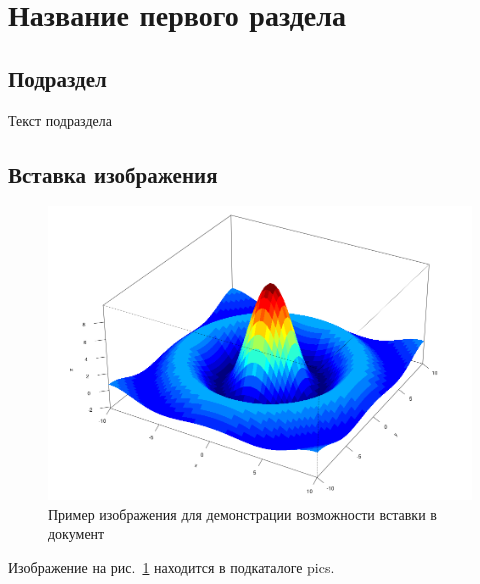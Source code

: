 
\section{Название первого раздела}

\subsection{Подраздел}

Текст подраздела

\subsection{Вставка изображения}

\begin{figure}
	\centering
	\includegraphics[width=0.7\linewidth]{pics/pic3D}
	\caption{Пример изображения для демонстрации возможности вставки в документ}
	\label{fig:pic3d}
\end{figure}



Изображение на рис.~\ref{fig:pic3d} находится в подкаталоге pics.


